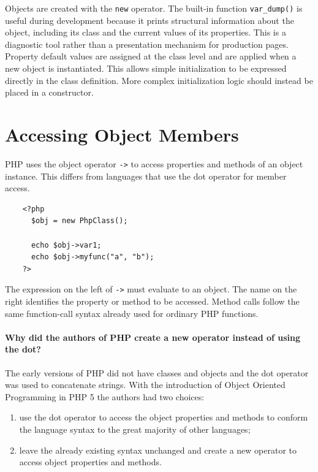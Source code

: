 \documentclass{scrbook}
\begin{document}
	Objects are created with the \texttt{new} operator. The built-in function \texttt{var\_dump()} is useful during development because it prints structural information about the object, including its class and the current values of its properties. This is a diagnostic tool rather than a presentation mechanism for production pages.\\
	
	Property default values are assigned at the class level and are applied when a new object is instantiated. This allows simple initialization to be expressed directly in the class definition. More complex initialization logic should instead be placed in a constructor.
	
	\section{Accessing Object Members}
	
	PHP uses the object operator \texttt{->} to access properties and methods of an object instance. This differs from languages that use the dot operator for member access.
	
	\begin{lstlisting}
	<?php
	  $obj = new PhpClass();
	
	  echo $obj->var1;
	  echo $obj->myfunc("a", "b");
	?>
	\end{lstlisting}
	
	The expression on the left of \texttt{->} must evaluate to an object. The name on the right identifies the property or method to be accessed. Method calls follow the same function-call syntax already used for ordinary PHP functions.
	
	\paragraph{Why did the authors of PHP create a new operator instead of using the dot?}
	
	The early versions of PHP did not have classes and objects and the dot operator was used to concatenate strings. With the introduction of Object Oriented Programming in PHP 5 the authors had two choices:
	\begin{enumerate}
		\item use the dot operator to access the object properties and methods to conform the language syntax to the great majority of other languages;
		\item leave the already existing syntax unchanged and create a new operator to access object properties and methods.
	\end{enumerate}
	
\end{document}
